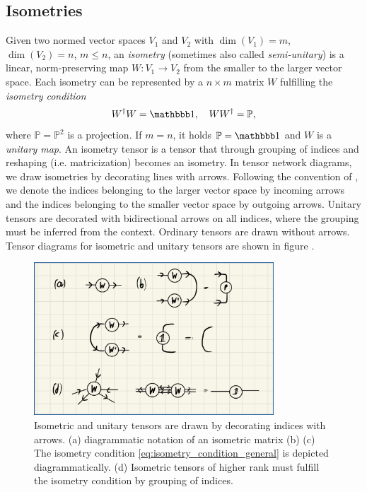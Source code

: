 \subsection*{Isometries}
Given two normed vector spaces $V_1$ and $V_2$ with $\dim\left(V_1\right) = m$, $\dim\left(V_2\right) = n$, $m \le n$, an \textit{isometry} (sometimes also called \textit{semi-unitary}) is a linear, norm-preserving map $W: V_1 \rightarrow V_2$ from the smaller to the larger vector space. Each isometry can be represented by a $n\times m$ matrix $W$ fulfilling the \textit{isometry condition}
\begin{equation}
	\label{eq:isometry_condition_general}
	W^\dagger W = \id, \quad WW^\dagger = \mathbb{P},
\end{equation}
where $\mathbb{P} = \mathbb{P}^2$ is a projection. If $m = n$, it holds $\mathbb{P} = \id$ and $W$ is a \textit{unitary map}. An isometry tensor is a tensor that through grouping of indices and reshaping (i.e. matricization) becomes an isometry. In tensor network diagrams, we draw isometries by decorating lines with arrows. Following the convention of \cite{cite:isometric_tensor_network_states_in_two_dimensions, cite:efficient_simulation_of_dynamics_in_two_dimensional_quantum_spin_systems}, we denote the indices belonging to the larger vector space by incoming arrows and the indices belonging to the smaller vector space by outgoing arrows. Unitary tensors are decorated with bidirectional arrows on all indices, where the grouping must be inferred from the context. Ordinary tensors are drawn without arrows. Tensor diagrams for isometric and unitary tensors are shown in figure .\par
\begin{figure}
	\centering
	\includegraphics[width=0.8\textwidth]{figures/Tensor_Networks/basic_isometric_tensor_diagrams.jpeg}
	\caption{Isometric and unitary tensors are drawn by decorating indices with arrows. (a) diagrammatic notation of an isometric matrix (b) (c) The isometry condition \eqref{eq:isometry_condition_general} is depicted diagrammatically. (d) Isometric tensors of higher rank must fulfill the isometry condition by grouping of indices.}
	\label{fig:isometries_and_unitaries_diagrams}
\end{figure}
